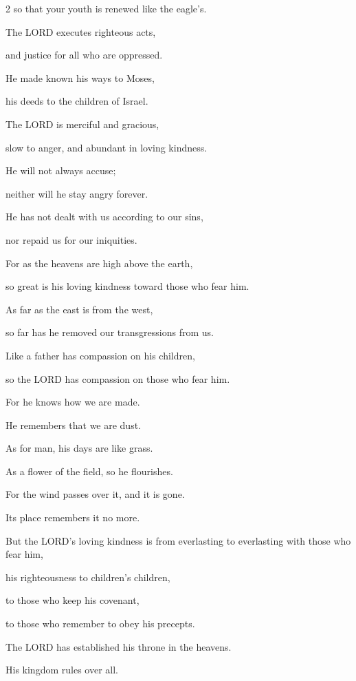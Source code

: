 \begin{multicols}{2}
	so that your youth is renewed like the eagle’s.
	
	
	\myverse{}The LORD executes righteous acts,
	
	and justice for all who are oppressed.
	
	
	\myverse{}He made known his ways to Moses,
	
	his deeds to the children of Israel.
	
	
	\myverse{}The LORD is merciful and gracious,
	
	slow to anger, and abundant in loving kindness.
	
	
	\myverse{}He will not always accuse;
	
	neither will he stay angry forever.
	
	
	\myverse{}He has not dealt with us according to our sins,
	
	nor repaid us for our iniquities.
	
	
	\myverse{}For as the heavens are high above the earth,
	
	so great is his loving kindness toward those who fear him.
	
	
	\myverse{}As far as the east is from the west,
	
	so far has he removed our transgressions from us.
	
	
	\myverse{}Like a father has compassion on his children,
	
	so the LORD has compassion on those who fear him.
	
	
	\myverse{}For he knows how we are made.
	
	He remembers that we are dust.
	
	
	\myverse{}As for man, his days are like grass.
	
	As a flower of the field, so he flourishes.
	
	
	\myverse{}For the wind passes over it, and it is gone.
	
	Its place remembers it no more.
	
	
	\myverse{}But the LORD’s loving kindness is from everlasting to everlasting
	with those who fear him,
	
	his righteousness to children’s children,
	
	
	\myverse{}to those who keep his covenant,
	
	to those who remember to obey his precepts.
	
	
	\myverse{}The LORD has established his throne in the heavens.
	
	His kingdom rules over all.
	

\end{multicols}
